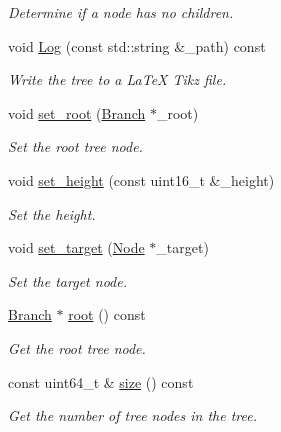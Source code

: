 \begin{DoxyCompactItemize}
\begin{DoxyCompactList}\small\item\em Determine if a node has no children. \end{DoxyCompactList}\item 
void \hyperlink{classosse_1_1collaborate_1_1_tree_aa0f69e21e7eacd90468ae534d83b0575}{Log} (const std\+::string \&\+\_\+path) const
\begin{DoxyCompactList}\small\item\em Write the tree to a La\+TeX Tikz file. \end{DoxyCompactList}\item 
void \hyperlink{classosse_1_1collaborate_1_1_tree_a7f289086d7ce1eb5bf8e500460ad3685}{set\+\_\+root} (\hyperlink{structosse_1_1collaborate_1_1_tree_1_1_branch}{Branch} $\ast$\+\_\+root)
\begin{DoxyCompactList}\small\item\em Set the root tree node. \end{DoxyCompactList}\item 
void \hyperlink{classosse_1_1collaborate_1_1_tree_ac4f62119ebc24b84843a1772c993165b}{set\+\_\+height} (const uint16\+\_\+t \&\+\_\+height)
\begin{DoxyCompactList}\small\item\em Set the height. \end{DoxyCompactList}\item 
void \hyperlink{classosse_1_1collaborate_1_1_tree_a6f95ca3aa1b76df2ddb562d11ea8d093}{set\+\_\+target} (\hyperlink{classosse_1_1collaborate_1_1_node}{Node} $\ast$\+\_\+target)
\begin{DoxyCompactList}\small\item\em Set the target node. \end{DoxyCompactList}\item 
\hyperlink{structosse_1_1collaborate_1_1_tree_1_1_branch}{Branch} $\ast$ \hyperlink{classosse_1_1collaborate_1_1_tree_a65d78ce80c9efa9af095d9081d6abc80}{root} () const
\begin{DoxyCompactList}\small\item\em Get the root tree node. \end{DoxyCompactList}\item 
const uint64\+\_\+t \& \hyperlink{classosse_1_1collaborate_1_1_tree_aef931848873af9beaccf80423935c474}{size} () const
\begin{DoxyCompactList}\small\item\em Get the number of tree nodes in the tree. \end{DoxyCompactList}\item 

\end{DoxyCompactItemize}
